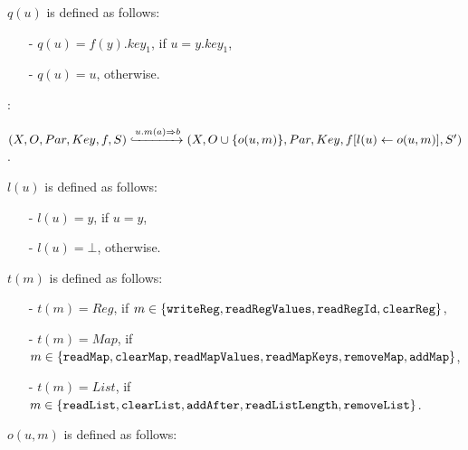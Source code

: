 $q(u)$ is defined as follows:

\begin{itemize}
\setlength{\itemsep}{0.5pt}
\item[-] $q(u) = f(y).\mathit{key}_1$, if $u = y.\mathit{key}_1$,

\item[-] $q(u) = u$, otherwise.
\end{itemize}



:

$(X,O,Par,Key,f,S) \xhookrightarrow{ u.m(a)\Rightarrow b } (X, O \cup \{ o(u,m) \}, Par, Key, f[l(u) \leftarrow o(u,m)], S')$.

$l(u)$ is defined as follows:

\begin{itemize}
\setlength{\itemsep}{0.5pt}
\item[-] $l(u) = y$, if $u = y$,

\item[-] $l(u) = \bot$, otherwise.
\end{itemize}

$t(m)$ is defined as follows:

\begin{itemize}
\setlength{\itemsep}{0.5pt}
\item[-] $t(m) = \mathit{Reg}$, if $m \in \{ {\tt writeReg}, {\tt readRegValues}, {\tt readRegId}, {\tt clearReg} \}$,

\item[-] $t(m) = \mathit{Map}$, if $m \in \{ {\tt readMap}, {\tt clearMap}, {\tt readMapValues}, {\tt readMapKeys}, {\tt removeMap}, {\tt addMap} \}$,

\item[-] $t(m) = \mathit{List}$, if $m \in \{ {\tt readList}, {\tt clearList}, {\tt addAfter}, {\tt readListLength}, {\tt removeList} \}$.
\end{itemize}

$o(u,m)$ is defined as follows:

